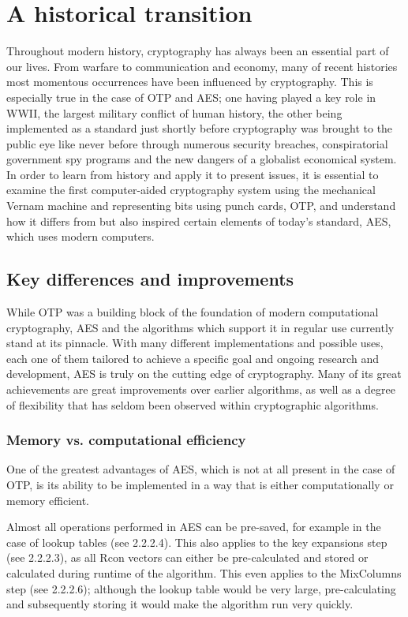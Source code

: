 \documentclass[12pt]{report}
\theoremstyle{definition}
\theoremstyle{remark}
\begin{document}
\chapter{A historical transition}
Throughout modern history, cryptography has always been an essential part of our lives. From warfare to communication and economy, many of recent histories most momentous occurrences have been influenced by cryptography. This is especially true in the case of OTP and AES; one having played a key role in WWII, the largest military conflict of human history, the other being implemented as a standard just shortly before cryptography was brought to the public eye like never before through numerous security breaches, conspiratorial government spy programs and the new dangers of a globalist economical system. In order to learn from history and apply it to present issues, it is essential to examine the first computer-aided cryptography system using the mechanical Vernam machine and representing bits using punch cards\cite{VernamMachine}, OTP, and understand how it differs from but also inspired certain elements of today's standard, AES, which uses modern computers.

\section{Key differences and improvements}
While OTP was a building block of the foundation of modern computational cryptography, AES and the algorithms which support it in regular use currently stand at its pinnacle. With many different implementations and possible uses, each one of them tailored to achieve a specific goal and ongoing research and development, AES is truly on the cutting edge of cryptography. Many of its great achievements are great improvements over earlier algorithms, as well as a degree of flexibility that has seldom been observed within cryptographic algorithms.

\subsection{Memory vs. computational efficiency}
One of the greatest advantages of AES, which is not at all present in the case of OTP, is its ability to be implemented in a way that is either computationally or memory efficient. 

Almost all operations performed in AES can be pre-saved, for example in the case of lookup tables (see 2.2.2.4). This also applies to the key expansions step (see 2.2.2.3), as all Rcon vectors can either be pre-calculated and stored or calculated during runtime of the algorithm. This even applies to the MixColumns step (see 2.2.2.6); although the lookup table would be very large, pre-calculating and subsequently storing it would make the algorithm run very quickly.
\end{document}
